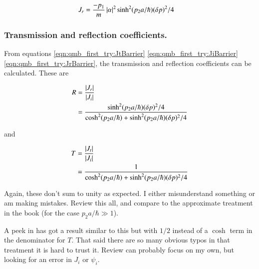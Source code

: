 \begin{align}\label{eqn:qmb_first_try:JrBarrier}
J_r
&= \frac{-p_1}{m} \left\lvert{\alpha}\right\rvert^2 \sinh^2(p_2 a/\hbar) (\delta p)^2/4
\end{align}

\subsubsection{Transmission and reflection coefficients. }

From equations \ref{eqn:qmb_first_try:JtBarrier} \ref{eqn:qmb_first_try:JiBarrier} \ref{eqn:qmb_first_try:JrBarrier}, the transmission and reflection coefficients can be calculated.
These are

\begin{align*}
R &=
\frac{\left\lvert{J_r}\right\rvert} {\left\lvert{J_i}\right\rvert} \\
&=
\frac{\sinh^2(p_2 a/\hbar) (\delta p)^2/4}{ \cosh^2(p_2 a/\hbar) + \sinh^2(p_2 a/\hbar) (\delta p)^2/4 }
\end{align*}

and

\begin{align*}
T &=
\frac{\left\lvert{J_t}\right\rvert} {\left\lvert{J_i}\right\rvert} \\
&=
\frac{1}{ \cosh^2(p_2 a/\hbar) + \sinh^2(p_2 a/\hbar) (\delta p)^2/4 }
\end{align*}

Again, these don't sum to unity as expected.  I either misunderstand something or am making mistakes.  Review this all, and compare to the approximate treatment in the book (for the case $p_2 a/\hbar \gg 1$).

A peek in \citep{mcmahon2005qmd} has got a result similar to this
but with $1/2$ instead of a $\cosh$ term in the denominator for $T$.  That
said there are so many obvious typos in that treatment it is hard 
to trust it.  Review
can probably focus on my own, but looking for an error in $J_i$ or $\psi_i$.

%
%

%
